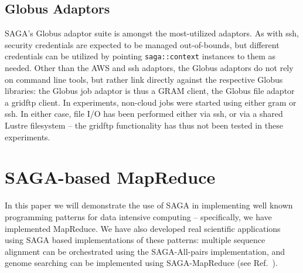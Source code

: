 \documentclass[conference,final]{IEEEtran}
\newcommand{\jhanote}[1]{ {\textcolor{red} { ***SJ: #1 }}}
\newcommand{\jhanote}[1]{}
\newcommand{\T}[1]{\texttt{#1}}
\begin{document}
\subsection{Globus Adaptors}
SAGA's Globus adaptor suite is amongst the most-utilized adaptors.  As
with ssh, security credentials are expected to be managed
out-of-bounds, but different credentials can be utilized by pointing
\T{saga::context} instances to them as needed.  Other than the AWS and
ssh adaptors, the Globus adaptors do not rely on command line tools,
but rather link directly against the respective Globus libraries: the
Globus job adaptor is thus a GRAM client, the Globus file adaptor a
gridftp client.  In experiments, non-cloud jobs were started using
either gram or ssh.  In either case, file I/O has been performed
either via ssh, or via a shared Lustre filesystem -- the gridftp
functionality has thus not been tested in these experiments.



\section{SAGA-based MapReduce}
In this paper we will demonstrate the use of SAGA in implementing well
known programming patterns for data intensive computing --
specifically, we have implemented MapReduce. We have also developed
real scientific applications using SAGA based implementations of these
patterns: multiple sequence alignment can be orchestrated using the
SAGA-All-pairs implementation, and genome searching can be implemented
using SAGA-MapReduce (see Ref.~\cite{saga_ccgrid09}).


\end{document}

